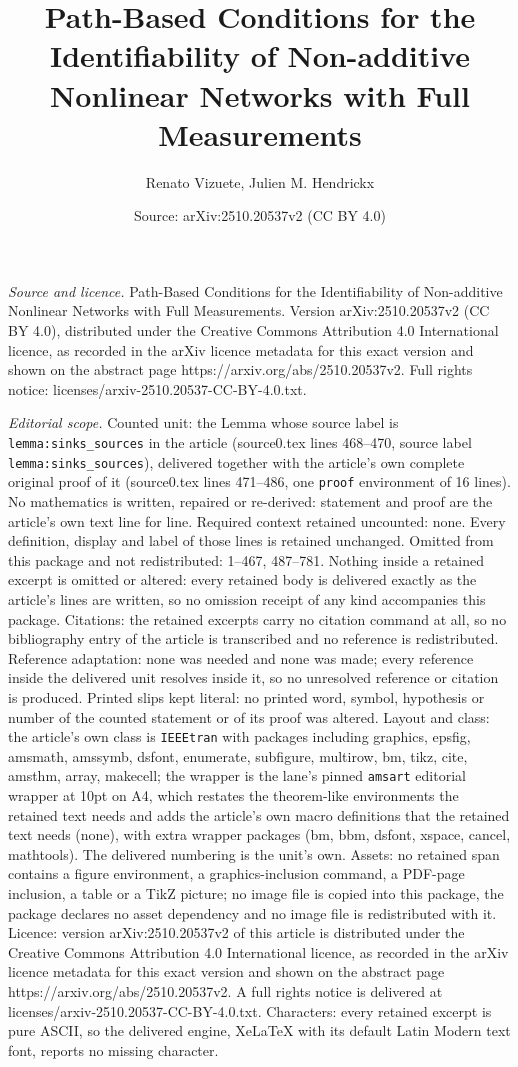 \documentclass[10pt,a4paper]{amsart}
\title[Path-Based Conditions for the Identifiability of Non-additiv]{Path-Based Conditions for the Identifiability of Non-additive Nonlinear Networks with Full Measurements}
\author{Renato Vizuete, Julien M. Hendrickx}
\date{Source: arXiv:2510.20537v2 (CC BY 4.0)}
\begin{document}
\maketitle

\noindent\emph{Source and licence.} Path-Based Conditions for the Identifiability of Non-additive Nonlinear Networks with Full Measurements. Version arXiv:2510.20537v2 (CC BY 4.0), distributed under the Creative Commons Attribution 4.0 International licence, as recorded in the arXiv licence metadata for this exact version and shown on the abstract page https://arxiv.org/abs/2510.20537v2. Full rights notice: licenses/arxiv-2510.20537-CC-BY-4.0.txt.\par\smallskip

\noindent\textit{Editorial scope.} Counted unit: the Lemma whose source label is \texttt{lemma:sinks\_sources} in the article (source0.tex lines 468--470, source label \texttt{lemma:sinks\_sources}), delivered together with the article's own complete original proof of it (source0.tex lines 471--486, one \texttt{proof} environment of 16 lines). No mathematics is written, repaired or re-derived: statement and proof are the article's own text line for line. Required context retained uncounted: none. Every definition, display and label of those lines is retained unchanged. Omitted from this package and not redistributed: 1--467, 487--781. Nothing inside a retained excerpt is omitted or altered: every retained body is delivered exactly as the article's lines are written, so no omission receipt of any kind accompanies this package. Citations: the retained excerpts carry no citation command at all, so no bibliography entry of the article is transcribed and no reference is redistributed. Reference adaptation: none was needed and none was made; every reference inside the delivered unit resolves inside it, so no unresolved reference or citation is produced. Printed slips kept literal: no printed word, symbol, hypothesis or number of the counted statement or of its proof was altered. Layout and class: the article's own class is \texttt{IEEEtran} with packages including graphics, epsfig, amsmath, amssymb, dsfont, enumerate, subfigure, multirow, bm, tikz, cite, amsthm, array, makecell; the wrapper is the lane's pinned \texttt{amsart} editorial wrapper at 10pt on A4, which restates the theorem-like environments the retained text needs and adds the article's own macro definitions that the retained text needs (none), with extra wrapper packages (bm, bbm, dsfont, xspace, cancel, mathtools). The delivered numbering is the unit's own. Assets: no retained span contains a figure environment, a graphics-inclusion command, a PDF-page inclusion, a table or a TikZ picture; no image file is copied into this package, the package declares no asset dependency and no image file is redistributed with it. Licence: version arXiv:2510.20537v2 of this article is distributed under the Creative Commons Attribution 4.0 International licence, as recorded in the arXiv licence metadata for this exact version and shown on the abstract page https://arxiv.org/abs/2510.20537v2. A full rights notice is delivered at licenses/arxiv-2510.20537-CC-BY-4.0.txt. Characters: every retained excerpt is pure ASCII, so the delivered engine, XeLaTeX with its default Latin Modern text font, reports no missing character.
\end{document}
